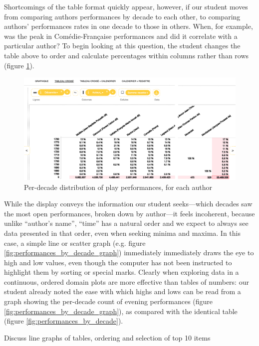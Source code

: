 \documentclass[	DIV=calc,%
							paper=a4,%
							fontsize=11pt,%
							twocolumn]{scrartcl}	 					%
\begin{document}
Shortcomings of the table format quickly appear, however, if our student moves from comparing authors performances by decade to each other, to comparing authors’ performances rates in one decade to those in others.  When, for example, was the peak in Comédie-Française performances and did it correlate with a particular author?  To begin looking at this question, the student changes the table above to order and calculate percentages within columns rather than rows (figure \ref{fig:percents-incoherent}).

\begin{figure}
  \centering
	\includegraphics[width=7in]{steps/percents-incoherent.png}
	\caption{Per-decade distribution of play performances, for each author}
	\label{fig:percents-incoherent}
\end{figure}

While the display conveys the information our student seeks—which decades saw the most open performances, broken down by author—it feels incoherent, because unlike ``author’s name'', ``time'' has a natural order and we expect to always see data presented in that order, even when seeking minima and maxima.  In this case, a simple line or scatter graph (e.g. figure \ref{fig:performances_by_decade_graph}) immediately immediately draws the eye to high and low values, even though the computer has not been instructed to highlight them by sorting or special marks.  Clearly when exploring data in a continuous, ordered domain plots are more effective than tables of numbers: our student already noted the ease with which highs and lows can be read from a graph showing the per-decade count of evening performances (figure \ref{fig:performances_by_decade_graph}), as compared with the identical table (figure \ref{fig:performances_by_decade}).



Discuss line graphs of tables, ordering and selection of top 10 items
\end{document}
